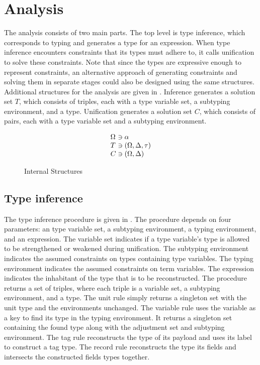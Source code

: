 \documentclass[acmsmall]{acmart}
\begin{document}
\section{Analysis}

The analysis consists of two main parts. The top level is type inference, which corresponds to typing
and generates a type for an expression. When type inference encounters constraints that its types must adhere to,
it calls unification to solve these constraints. Note that since the types are expressive enough to represent constraints,
an alternative approach of generating constraints and solving them in separate stages could also be designed 
using the same structures. Additional structures for the analysis are given in . 
Inference generates a solution set $T$, which consists of triples, each with a type variable set, a subtyping environment, and a type.  
Unification generates a solution set $C$, which consists of pairs, each with a type variable set and a subtyping environment. 


\begin{figure*}[h]
\[
\begin{array}{l @{} l}
  \Omega 
  &{} \owns \alpha 
  \\
  T 
  &{} \owns (\Omega, \Delta, \tau)
  \\
  C 
  &{} \owns (\Omega, \Delta)
  \\
\end{array}
\]

\caption{Internal Structures}
\label{fig:internal}
\end{figure*}

\subsection{Type inference}
The type inference procedure is given in .
The procedure depends on four parameters: an type variable set, a subtyping environment, 
a typing environment, and an expression.
The variable set indicates if a type variable's type is allowed to be strengthened or weakened  
during unification.
The subtyping environment indicates the assumed constraints on types containing type variables.
The typing environment indicates the assumed constraints on term variables.
The expression indicates the inhabitant of the type that is to be reconstructed.
The procedure returns a set of triples, where each triple is a variable set, a subtyping environment,
and a type.
The unit rule simply returns a singleton set with the unit type and the environments unchanged. 
The variable rule uses the variable as a key to find its type in the typing environment. 
It returns a singleton set containing the found type along with the adjustment set and subtyping environment.
The tag rule reconstructs the type of its payload and uses its label to construct a tag type.
The record rule reconstructs the type its fields and intersects the constructed fields types together.
\end{document}
